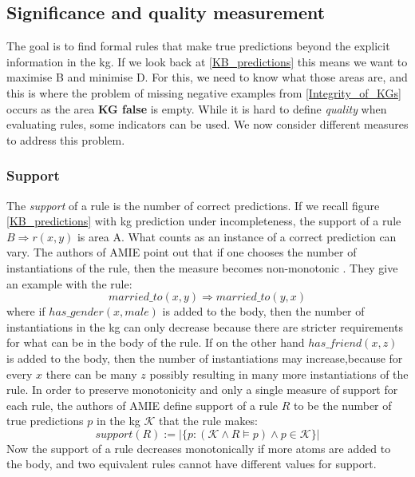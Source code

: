 \subsection{Significance and quality measurement}
\label{significance_and_quality}
The goal is to find formal rules that make true predictions beyond the explicit information in the \gls{kg}. If we look back at \cref{KB_predictions} this means we want to maximise B and minimise D. For this, we need to know what those areas are, and this is where the problem of missing negative examples from \cref{Integrity_of_KGs} occurs as the area \textbf{KG false} is empty. While it is hard to define \textit{quality} when evaluating rules, some indicators can be used. We now consider different measures to address this problem.

\subsubsection{Support}
The \textit{support} of a rule is the number of correct predictions. If we recall figure \cref{KB_predictions} with \gls{kg} prediction under incompleteness, the support of a rule $B \Rightarrow r(x,y)$ is area A. What counts as an instance of a correct prediction can vary. The authors of AMIE point out that if one chooses the number of instantiations of the rule, then the measure becomes non-monotonic \cite{amie3}. They give an example with the rule:
\[married\_to(x, y) \Rightarrow married\_to(y, x)\]
where if $has\_gender(x, male)$ is added to the body, then the number of instantiations in the \gls{kg} can only decrease because there are stricter requirements for what can be in the body of the rule. If on the other hand $has\_friend(x, z)$ is added to the body, then the number of instantiations may increase,because for every $x$ there can be many $z$ possibly resulting in many more instantiations of the rule. In order to preserve monotonicity and only a single measure of support for each rule, the authors of AMIE define support of a rule $R$ to be the number of true predictions $p$ in the \gls{kg} $\mathcal{K}$ that the rule makes:
\[support(R) :=  | \{p : (\mathcal{K} \wedge R \models p)\wedge p \in \mathcal{K} \}|\]
Now the support of a rule decreases monotonically if more atoms are added to the body, and two equivalent rules cannot have different values for support.

